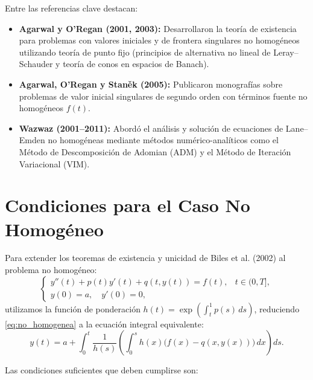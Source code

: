 \documentclass[12pt,a4paper]{article}
\begin{document}
Entre las referencias clave destacan:
\begin{itemize}
    \item \textbf{Agarwal y O'Regan (2001, 2003):} Desarrollaron la teoría de existencia para problemas con valores iniciales y de frontera singulares no homogéneos utilizando teoría de punto fijo (principios de alternativa no lineal de Leray--Schauder y teoría de conos en espacios de Banach).
    \item \textbf{Agarwal, O'Regan y Stan\v{e}k (2005):} Publicaron monografías sobre problemas de valor inicial singulares de segundo orden con términos fuente no homogéneos $f(t)$.
    \item \textbf{Wazwaz (2001--2011):} Abordó el análisis y solución de ecuaciones de Lane--Emden no homogéneas mediante métodos numérico-analíticos como el Método de Descomposición de Adomian (ADM) y el Método de Iteración Variacional (VIM).
\end{itemize}

\section{Condiciones para el Caso No Homogéneo}

Para extender los teoremas de existencia y unicidad de Biles et al. (2002) al problema no homogéneo:
\begin{equation} \label{eq:no_homogenea}
\begin{cases}
y''(t) + p(t) y'(t) + q(t, y(t)) = f(t), & t \in (0, T], \\
y(0) = a, \quad y'(0) = 0,
\end{cases}
\end{equation}
utilizamos la función de ponderación $h(t) = \exp\left(\int_t^1 p(s) \, ds\right)$, reduciendo \eqref{eq:no_homogenea} a la ecuación integral equivalente:
\[
y(t) = a + \int_0^t \frac{1}{h(s)} \left( \int_0^s h(x) \big( f(x) - q(x, y(x)) \big) \, dx \right) ds.
\]

Las condiciones suficientes que deben cumplirse son:
\end{document}
